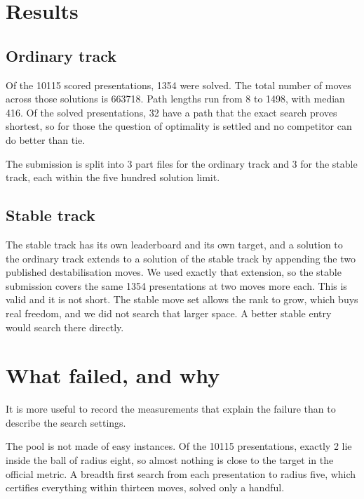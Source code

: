\documentclass[11pt]{article}
\newcommand{\nSolvedAC}{1354}
\newcommand{\nSolvedStable}{1354}
\newcommand{\nProved}{32}
\newcommand{\totMoves}{663718}
\newcommand{\medLen}{416}
\newcommand{\minLen}{8}
\newcommand{\maxLen}{1498}
\newcommand{\poolSize}{10115}
\newcommand{\inBall}{2}
\newcommand{\nPartsAC}{3}
\newcommand{\nPartsStable}{3}
\begin{document}
\section{Results}

\subsection{Ordinary track}

Of the \poolSize{} scored presentations, \nSolvedAC{} were solved. The total number of moves across those solutions is \totMoves{}. Path lengths run from \minLen{} to \maxLen{}, with median \medLen{}. Of the solved presentations, \nProved{} have a path that the exact search proves shortest, so for those the question of optimality is settled and no competitor can do better than tie.

The submission is split into \nPartsAC{} part files for the ordinary track and \nPartsStable{} for the stable track, each within the five hundred solution limit.

\subsection{Stable track}

The stable track has its own leaderboard and its own target, and a solution to the ordinary track extends to a solution of the stable track by appending the two published destabilisation moves. We used exactly that extension, so the stable submission covers the same \nSolvedStable{} presentations at two moves more each. This is valid and it is not short. The stable move set allows the rank to grow, which buys real freedom, and we did not search that larger space. A better stable entry would search there directly.

\section{What failed, and why}

It is more useful to record the measurements that explain the failure than to describe the search settings.

The pool is not made of easy instances. Of the \poolSize{} presentations, exactly \inBall{} lie inside the ball of radius eight, so almost nothing is close to the target in the official metric. A breadth first search from each presentation to radius five, which certifies everything within thirteen moves, solved only a handful.
\end{document}
